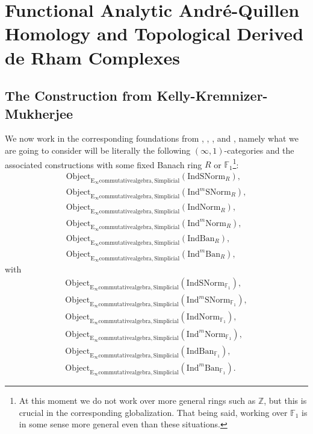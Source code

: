 \documentclass[11pt]{book}
\theoremstyle{definition}
\numberwithin{equation}{section}
\begin{document}
\section{Functional Analytic Andr\'e-Quillen Homology and Topological Derived de Rham Complexes}

\subsection{The Construction from Kelly-Kremnizer-Mukherjee}


\indent We now work in the corresponding foundations from \cite{12BBBK}, \cite{12BBK}, \cite{BBM}, \cite{12BK} and \cite{KKM}, namely what we are going to consider will be literally the following $(\infty,1)$-categories and the associated constructions with some fixed Banach ring $R$ or $\mathbb{F}_1$\footnote{At this moment we do not work over more general rings such as $\mathbb{Z}$, but this is crucial in the corresponding globalization. That being said, working over $\mathbb{F}_1$ is in some sense more general even than these situations.}:
\begin{align}
\mathrm{Object}_{\mathrm{E}_\infty\mathrm{commutativealgebra},\mathrm{Simplicial}}(\mathrm{IndSNorm}_R),\\
\mathrm{Object}_{\mathrm{E}_\infty\mathrm{commutativealgebra},\mathrm{Simplicial}}(\mathrm{Ind}^m\mathrm{SNorm}_R),\\
\mathrm{Object}_{\mathrm{E}_\infty\mathrm{commutativealgebra},\mathrm{Simplicial}}(\mathrm{IndNorm}_R),\\
\mathrm{Object}_{\mathrm{E}_\infty\mathrm{commutativealgebra},\mathrm{Simplicial}}(\mathrm{Ind}^m\mathrm{Norm}_R),\\
\mathrm{Object}_{\mathrm{E}_\infty\mathrm{commutativealgebra},\mathrm{Simplicial}}(\mathrm{IndBan}_R),\\
\mathrm{Object}_{\mathrm{E}_\infty\mathrm{commutativealgebra},\mathrm{Simplicial}}(\mathrm{Ind}^m\mathrm{Ban}_R),
\end{align}
with
\begin{align}
\mathrm{Object}_{\mathrm{E}_\infty\mathrm{commutativealgebra},\mathrm{Simplicial}}(\mathrm{IndSNorm}_{\mathbb{F}_1}),\\
\mathrm{Object}_{\mathrm{E}_\infty\mathrm{commutativealgebra},\mathrm{Simplicial}}(\mathrm{Ind}^m\mathrm{SNorm}_{\mathbb{F}_1}),\\
\mathrm{Object}_{\mathrm{E}_\infty\mathrm{commutativealgebra},\mathrm{Simplicial}}(\mathrm{IndNorm}_{\mathbb{F}_1}),\\
\mathrm{Object}_{\mathrm{E}_\infty\mathrm{commutativealgebra},\mathrm{Simplicial}}(\mathrm{Ind}^m\mathrm{Norm}_{\mathbb{F}_1}),\\
\mathrm{Object}_{\mathrm{E}_\infty\mathrm{commutativealgebra},\mathrm{Simplicial}}(\mathrm{IndBan}_{\mathbb{F}_1}),\\
\mathrm{Object}_{\mathrm{E}_\infty\mathrm{commutativealgebra},\mathrm{Simplicial}}(\mathrm{Ind}^m\mathrm{Ban}_{\mathbb{F}_1}).
\end{align}
\end{document}

